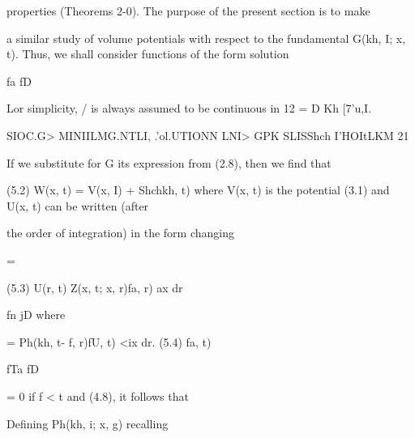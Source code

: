 \begin{ocrformula}
properties (Theorems    2-0). The purpose of the present section is to make
\end{ocrformula}

a similar study of volume potentials with respect to the fundamental G(kh, I; x, t). Thus, we shall consider functions of the form solution

\begin{ocrformula}
(L.!)                       \V{x, 0 =                          T{x, t; x, r)/(PS, r) i/x dr.
\end{ocrformula}

fa fD

\begin{ocrformula}
Lor simplicity, / is always                   assumed              to be continuous             in 12 =    D     Kh   [7'u,I\].
\end{ocrformula}

SIOC.G> MINIILMG.NTLI, .'ol.UTIONN LNI> GPK SLISShch I'HOItLKM 21

If we substitute for G its expression from (2.8), then we find that

\begin{ocrformula}
(5.2)                                  W(x,          t) =          V(x, I) +        Shchkh,     t)
where   V(x, t) is the potential (3.1) and U(x, t) can be written                                              (after
\end{ocrformula}

the order of integration) in the form changing

=

\begin{ocrformula}
(5.3)                          U(r, t)                             Z(x, t; x, r)fa, r) ax dr
\end{ocrformula}

fn jD where

\begin{ocrformula}
=                      Ph(kh, t- f, r)fU, t) <ix dr.
(5.4)                          fa,    t)
\end{ocrformula}

fTa fD

\begin{ocrformula}
= 0 if f < t and                                                   (4.8), it follows that
\end{ocrformula}

Defining Ph(kh, i; x, g) recalling

